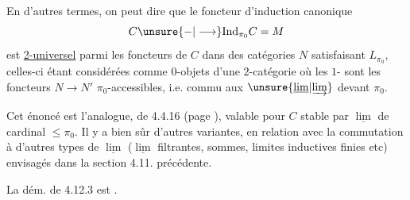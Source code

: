 En d'autres termes, on peut dire que
le foncteur d'induction canonique
\[
 C\unsure{-|\longrightarrow}\mathrm{Ind}_{\pi_0}C=M
\]
est \uline{2-universel} parmi les foncteurs de
$C$ dans des catégories $N$ satisfaisant $L_{\pi_0}$,
celles-ci  étant considérées comme
$0$-objets d'une $2$-catégorie où les
$1$- sont les foncteurs $N\longrightarrow N'$
$\pi_0$-accessibles, i.e. commu aux
$\unsure{\underline{\lim}|\underrightarrow{\lim}}$  devant $\pi_0$.

Cet énoncé est l'analogue,  de 4.4.16
(page ), valable pour $C$ stable par
$\underline{\lim}$ de cardinal $\leq\pi_0$. Il y a bien
sûr d'autres variantes, en relation avec
la  commutation à d'autres
types de $\underline{\lim}$ ($\underline{\lim}$ filtrantes, sommes,
limites inductives finies etc) envisagés
dans la section 4.11. précédente.

La dém. de 4.12.3 est .

